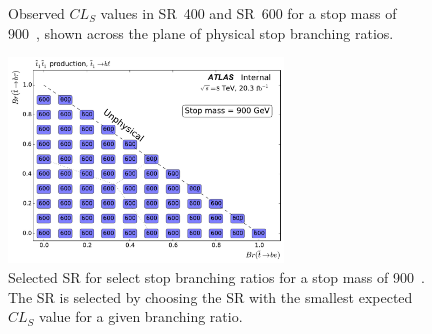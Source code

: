 \begin{figure}[ht]
  \centering
  \caption{
    Observed $CL_S$ values in SR~400 and SR~600 for a stop mass of 900~\GeV,
    shown across the plane of physical stop branching ratios.
  }
\end{figure}

\begin{figure}[ht]
  \centering
  \includegraphics[width=0.65\textwidth]
    {figs/blstop/region_selection/region_choice_vs_br_m_900.pdf}
  \caption{
    Selected SR for select stop branching ratios for a stop mass of 900~\GeV.
    The SR is selected by choosing the SR with the smallest expected $CL_S$
    value for a given branching ratio.
  }
\end{figure}

